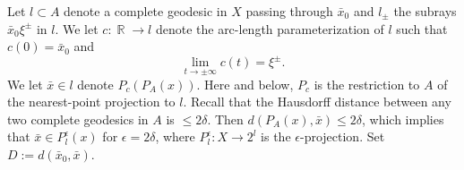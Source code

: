 \documentclass[12pt]{amsbook}%
\newtheorem{lem}[thm]{Lemma}
\theoremstyle{definition}
\theoremstyle{remark}
\numberwithin{section}{chapter}
\numberwithin{subsection}{section}
\numberwithin{figure}{chapter}
\DeclareMathOperator{\R}{\mathbb{R}}
\def\eps{\epsilon}
\begin{document}
Let $l\subset A$ denote a complete geodesic in $X$ passing through $\bar{x}_0$ and $l_\pm$ the subrays $\bar{x}_0\xi^\pm$ in $l$. We let $c: \R \to l$ denote the arc-length parameterization of $l$ such that
 $c(0)= \bar{x}_0$ and 
$$
\lim_{t\to \pm \infty} c(t)= \xi^\pm. 
$$
We let $\bar{x}\in l$ denote $P_c(P_A(x))$. Here and below, $P_c$ is the restriction to $A$ of the nearest-point projection to $l$. Recall that the Hausdorff distance between any two complete geodesics in $A$ is $\leqslant 2\delta$. 
Then $d(P_A(x), \bar{x})\leqslant 2\delta$, which implies that 
$\bar{x}\in P^\eps_l(x)$ for $\eps=2\delta$, where $P^\eps_l: X\to 2^l$ is the $\eps$-projection.  Set $D:= d(\bar{x}_0, \bar{x})$.   

\end{document}
